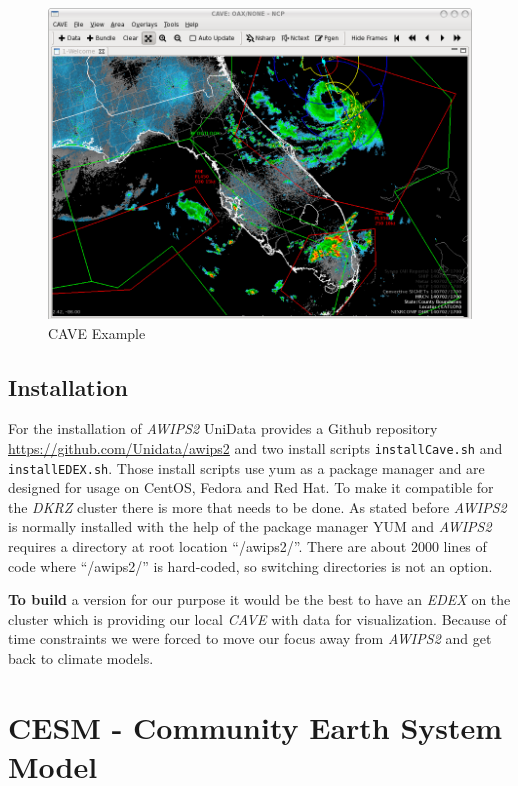 \documentclass[]{article}
\begin{document}
\begin{figure}
\centering
\includegraphics{pics/Unidata_AWIPS2_CAVE.png}
\caption{CAVE Example}
\end{figure}

\subsection{Installation}\label{installation}

For the installation of \emph{AWIPS2} UniData provides a Github
repository \url{https://github.com/Unidata/awips2} and two install
scripts \texttt{installCave.sh} and \texttt{installEDEX.sh}. Those
install scripts use yum as a package manager and are designed for usage
on CentOS, Fedora and Red Hat. To make it compatible for the \emph{DKRZ}
cluster there is more that needs to be done. As stated before
\emph{AWIPS2} is normally installed with the help of the package manager
YUM and \emph{AWIPS2} requires a directory at root location
``/awips2/''. There are about 2000 lines of code where ``/awips2/'' is
hard-coded, so switching directories is not an option.

\textbf{To build} a version for our purpose it would be the best to have
an \emph{EDEX} on the cluster which is providing our local \emph{CAVE}
with data for visualization. Because of time constraints we were forced
to move our focus away from \emph{AWIPS2} and get back to climate
models.

\pagebreak

\section{CESM - Community Earth System
Model}\label{cesm---community-earth-system-model}
\end{document}
